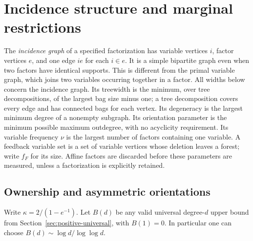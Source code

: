 \section{Incidence structure and marginal restrictions}\label{sec:incidence}
The \emph{incidence graph} of a specified factorization has variable vertices
$i$, factor vertices $e$, and one edge $ie$ for each $i\in e$. It is a
simple bipartite graph even when two factors have identical supports. This
is different from the primal variable graph, which joins two variables
occurring together in a factor. All widths below concern the incidence graph.
Its treewidth is the minimum, over tree decompositions, of the largest bag
size minus one; a tree decomposition covers every edge and has connected
bags for each vertex. Its degeneracy is the largest minimum degree of a
nonempty subgraph. Its orientation parameter is the minimum possible maximum
outdegree, with no acyclicity requirement. Its variable frequency $\nu$ is
the largest number of factors containing one variable. A feedback variable
set is a set of variable vertices whose deletion leaves a forest; write
$f_F$ for its size. Affine factors are discarded before these parameters
are measured, unless a factorization is explicitly retained.

\subsection{Ownership and asymmetric orientations}
Write $\kappa=2/(1-e^{-1})$. Let $B(d)$ be any valid universal degree-$d$
upper bound from Section~\ref{sec:positive-universal}, with $B(1)=0$.
In particular one can choose $B(d)\sim\log d/\log\log d$.

